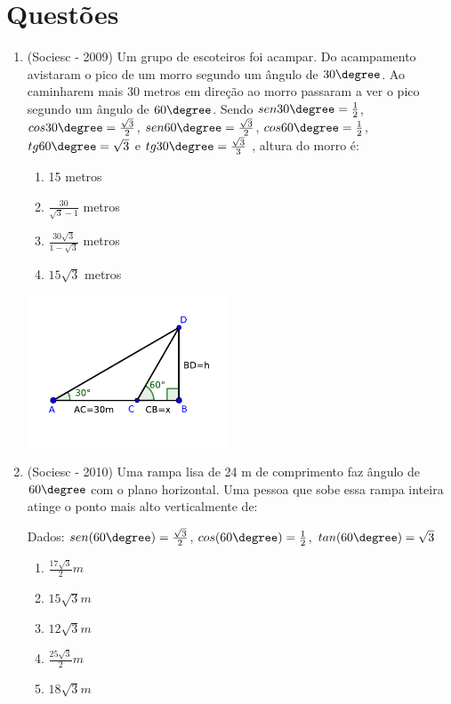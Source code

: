  \section{Questões}
\begin{enumerate}
 \item (Sociesc - 2009) Um grupo de escoteiros foi acampar. Do acampamento avistaram o pico de um morro segundo um ângulo de $30 \degree$. Ao caminharem mais 30 metros em direção ao morro passaram a ver o pico segundo um ângulo de $60 \degree$. Sendo $sen 30\degree = \frac{1}{2}$, $cos 30\degree =\frac{\sqrt{3}}{2}$, $sen 60\degree =\frac{\sqrt{3}}{2}$, $cos 60\degree =\frac{1}{2}$, $tg 60\degree = \sqrt{3}$ e $tg 30\degree =\frac{\sqrt{3}}{3}$ , altura do morro é:
 \begin{multicols}{2}

 \begin{enumerate}
  \item 15 metros
  \item $\frac{30}{\sqrt{3}-1}$ metros
  \item $\frac{30\sqrt{3}}{1-\sqrt{3}}$ metros
  \item $15\sqrt{3}$ metros
 \end{enumerate}

 \includegraphics[width=6cm]{../../Topicos/Figuras/tri_ret_exer.pdf}

 \end{multicols}

 \item (Sociesc - 2010) Uma rampa lisa de 24 m de comprimento faz ângulo de $60\degree$ com o plano horizontal. Uma pessoa que sobe essa rampa inteira atinge o ponto mais alto verticalmente de:

  Dados: $sen (60\degree)= \frac{\sqrt{3}}{2}$, $cos (60\degree)= \frac{1}{2}$, $tan (60\degree)= \sqrt{3}$
 \begin{multicols}{2}

 \begin{enumerate}
  \item $\frac{17 \sqrt{3}}{2} m$
  \item $15\sqrt{3} m$
  \item $12\sqrt{3} m$
  \item $\frac{25 \sqrt{3}}{2} m$
  \item $18\sqrt{3} m$
 \end{enumerate}


\end{multicols}
\end{enumerate}
